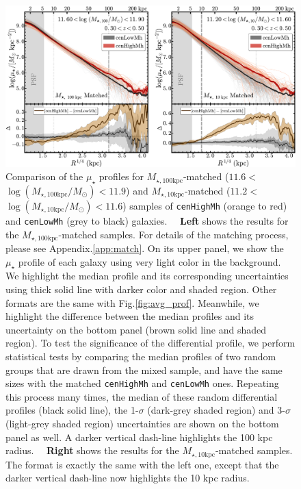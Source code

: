 \documentclass{emulateapj}
\def\rbcg{\texttt{cenHighMh}}
\def\nbcg{\texttt{cenLowMh}}
\def\minn{{$M_{\star,10\mathrm{kpc}}$}}
\def\mtot{{$M_{\star,100\mathrm{kpc}}$}}
\def\logminn{{$\log (M_{\star,10\mathrm{kpc}}/M_{\odot})$}}
\def\logmtot{{$\log (M_{\star,100\mathrm{kpc}}/M_{\odot})$}}
\def\mden{{$\mu_{\star}$}}
\begin{document}
\begin{CJK*}{UTF8}{gbsn}
  \begin{figure}[t!]
      \centering 
      \includegraphics[width=\textwidth]{fig/redbcg_prof_1}
      \caption{
          Comparison of the \mden{} profiles for \mtot{}-matched ($11.6<$\logmtot{}$<11.9$) 
          and \minn{}-matched ($11.2<$\logminn{}$<11.6$) samples 
          of \rbcg{} (orange to red) and \nbcg{} (grey to black) galaxies.~~
          \textbf{Left} shows the results for the \mtot{}-matched samples.
          For details of the matching process, please see Appendix.\ref{app:match}.  
          On its upper panel, we show the \mden{} profile of each galaxy using very light 
          color in the background.  
          We highlight the median profile and its corresponding uncertainties using thick 
          solid line with darker color and shaded region. 
          Other formats are the same with Fig.\ref{fig:avg_prof}.
          Meanwhile, we highlight the difference between the median profiles and its 
          uncertainty on the bottom panel (brown solid line and shaded region).
          To test the significance of the differential profile, we perform statistical tests 
          by comparing the median profiles of two random groups that are drawn from the 
          mixed sample, and have the same sizes with the matched \rbcg{} and \nbcg{} ones.
          Repeating this process many times, the median of these random differential 
          profiles (black solid line), the 1-$\sigma$ (dark-grey shaded region) and 3-$\sigma$
          (light-grey shaded region) uncertainties are shown on the bottom panel as well. 
          A darker vertical dash-line highlights the 100 kpc radius.~~
          \textbf{Right} shows the results for the \minn{}-matched samples. 
          The format is exactly the same with the left one, except that the darker vertical 
          dash-line now highlights the 10 kpc radius.
      }
      \label{fig:prof_1} 
  \end{figure}


\end{CJK*}
\end{document}

